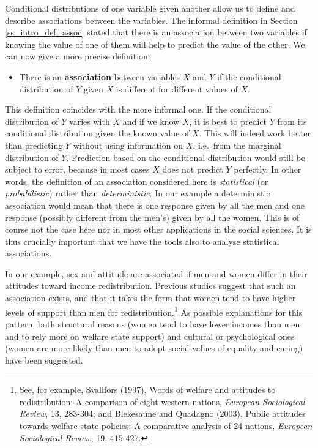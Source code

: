 Conditional distributions of one variable given another allow us to
define and describe associations between the variables. The informal
definition in Section \ref{ss_intro_def_assoc} stated that there
is an association between two variables if knowing the value of one of
them will help to predict the value of the other.
We can now give a more precise definition:
\begin{itemize}
\item
There is an \textbf{association} between variables $X$ and $Y$ if the
conditional distribution of $Y$ given $X$ is different for different
values of $X$.
\end{itemize}
This definition coincides with the more informal one. If the conditional
distribution of $Y$ varies with $X$ and if we know $X$, it is best to
predict $Y$ from its conditional distribution given the known value of
$X$. This will indeed work better than predicting $Y$ without using
information on $X$, i.e.\ from the marginal distribution of $Y$.
Prediction based on the conditional distribution would still be subject
to error, because in most cases $X$ does not predict $Y$ perfectly. In
other words, the definition of an association considered here is
\emph{statistical} (or \emph{probabilistic}) rather than
\emph{deterministic}. In our example a deterministic association would
mean that there is one response given by all the men and one response
(possibly different from the men's) given by all the women. This is of
course not the case here nor in most other applications in the social
sciences. It is thus crucially important that we have the tools also to
analyse statistical associations.

In our example, sex and attitude are associated if men and women differ
in their attitudes toward income redistribution. Previous studies
suggest that such an association exists, and that it takes the form that
women tend to have higher levels of support than men for
redistribution.\footnote{See, for example, Svallfors (1997), Words of
welfare and attitudes to redistribution: A comparison of eight western
nations, \emph{European Sociological Review}, 13, 283-304; and Blekesaune
and Quadagno (2003), Public attitudes towards welfare state policies: A
comparative analysis of 24 nations, \emph{European Sociological Review},
19, 415-427.} As possible explanations for this pattern, both structural
reasons (women tend to have lower incomes than men and to rely more on
welfare state support) and cultural or psychological ones (women are
more likely than men to adopt social values of equality and caring) have
been suggested.


